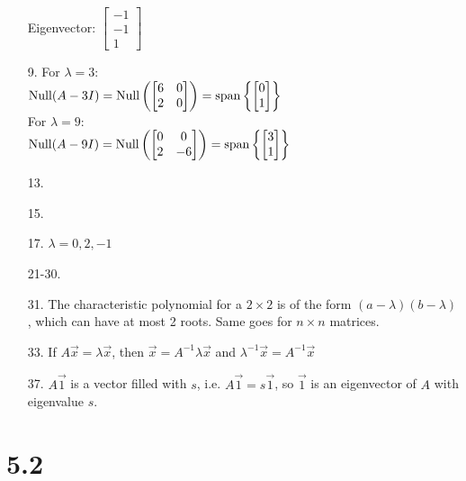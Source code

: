 \documentclass[leqno]{article}
\begin{document}
\begin{enumerate}
    Eigenvector: $\begin{bmatrix}-1 \\ -1 \\ 1\end{bmatrix}$
    \item[9.]
    For $\lambda = 3$:\\
    $\operatorname{Null}(A - 3I) = \operatorname{Null}\left(\begin{bmatrix}6 & 0 \\ 2 & 0\end{bmatrix}\right) = \mathrm{span}\left\{\begin{bmatrix}0 \\ 1\end{bmatrix}\right\}$\\
    For $\lambda = 9$:\\
    $\operatorname{Null}(A - 9I) = \operatorname{Null}\left(\begin{bmatrix}0 & 0 \\ 2 & -6\end{bmatrix}\right) = \mathrm{span}\left\{\begin{bmatrix}3 \\ 1\end{bmatrix}\right\}$
    \item[13.]
    \item[15.]
    \item[17.] $\lambda = 0, 2, -1$
    \item[21-30.]
    \item[31.] The characteristic polynomial for a $2 \times 2$ is of the form $(a - \lambda)(b - \lambda)$, which can have at most 2 roots. Same goes for $n \times n$ matrices.
    \item[33.] If $A\Vec x = \lambda\Vec x$, then $\Vec x = A^{-1}\lambda\Vec x$ and $\lambda^{-1}\Vec x = A^{-1}\Vec x$
    \item[37.] $A\Vec 1$ is a vector filled with $s$, i.e. $A\Vec 1 = s\Vec 1$, so $\Vec 1$ is an eigenvector of $A$ with eigenvalue $s$.
\end{enumerate}

\section*{5.2}
\end{document}
